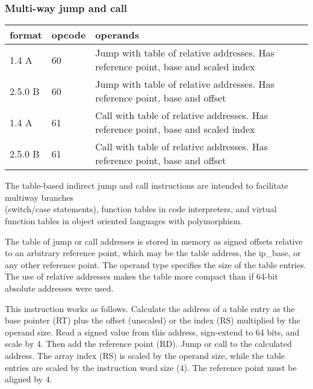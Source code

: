 \documentclass[forwardcom.tex]{subfiles}
\begin{document}
\subsubsection{Multi-way jump and call}
\label{table:multiwayJumpCallInstructions}
\begin{tabular}{|p{12mm}|p{12mm}|p{110mm}|}
\hline
\bfseries format & \bfseries opcode & \bfseries operands \\ \hline
1.4 A   & 60 & Jump with table of relative addresses. \linebreak Has reference point, base and scaled index  \\ \hline
2.5.0 B & 60 & Jump with table of relative addresses. \linebreak Has reference point, base and offset  \\ \hline
1.4 A   & 61 & Call with table of relative addresses. \linebreak Has reference point, base and scaled index    \\ \hline
2.5.0 B & 61 & Call with table of relative addresses. \linebreak Has reference point, base and offset \\ \hline
\end{tabular}
\vspace{2mm}

\label{jumpTableInstruction}
The table-based indirect jump and call instructions are intended to facilitate multiway branches \\
(switch/case statements), function tables in code interpreters, and virtual function tables in object oriented languages with polymorphism. 
\vspace{2mm}

The table of jump or call addresses is stored in memory as signed offsets relative to an arbitrary reference point, which may be the table address, the ip\_base, or any other reference point. The operand type specifies the size of the table entries. The use of relative addresses makes the table more compact than if 64-bit absolute addresses were used.
\vspace{2mm}

This instruction works as follows. Calculate the address of a table entry as the base pointer (RT) plus the offset (unscaled) or the index (RS) multiplied by the operand size. Read a signed value from this address, sign-extend to 64 bits, and scale by 4. Then add the reference point (RD). Jump or call to the calculated address. The array index (RS) is scaled by the operand size, while the table entries are scaled by the instruction word size (4). The reference point must be aligned by 4.
\vspace{2mm}
\end{document}

